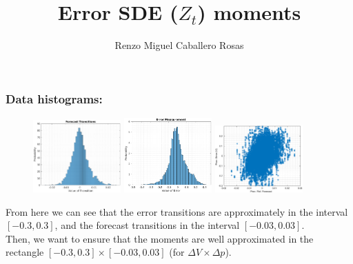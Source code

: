 \documentclass[aspectratio=169]{beamer}\usepackage[utf8]{inputenc}
\title{Error SDE ($Z_t$) moments}
\subtitle{Renzo Miguel Caballero Rosas}
\begin{document}
\begin{frame}
\titlepage
\end{frame}


\begin{frame}\frametitle{Data histograms:}

\begin{figure}[ht!]
\centering
\includegraphics[width=0.3\textwidth]{../../MATLAB_Files/Results/histograms/others/forecast_transitions.eps}\quad
\includegraphics[width=0.3\textwidth]{../../MATLAB_Files/Results/histograms/others/error_measurement.eps}\quad
\includegraphics[width=0.3\textwidth]{../../MATLAB_Files/Results/histograms/others/error_and_forecast.eps}
\end{figure}
From here we can see that the error transitions are approximately in the interval $[-0.3,0.3]$, and the forecast transitions in the interval $[-0.03,0.03]$.\\
Then, we want to ensure that the moments are well approximated in the rectangle $[-0.3,0.3]\times[-0.03,0.03]$ (for $\Delta V\times\Delta p$).

\end{frame}
\end{document}
